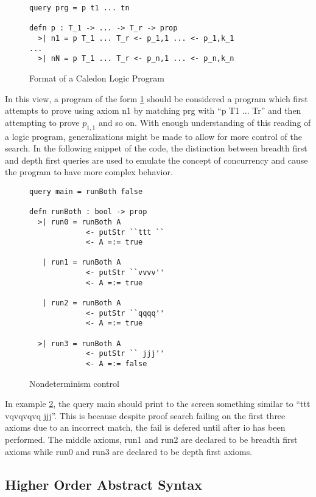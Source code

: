 \begin{figure}[H]
\begin{lstlisting}
query prg = p t1 ... tn

defn p : T_1 -> ... -> T_r -> prop
  >| n1 = p T_1 ... T_r <- p_1,1 ... <- p_1,k_1
...
  >| nN = p T_1 ... T_r <- p_n,1 ... <- p_n,k_n

\end{lstlisting}
\caption{Format of a Caledon Logic Program}
\label{code:format}
\end{figure}

In this view, a program of the form \ref{code:format}
should be considered a program which first attempts to prove using axiom n1 by matching prg with ``p T1 ... Tr'' and then
attempting to prove $p_{1,1}$ and so on.    With enough understanding of this reading of a logic program, generalizations might be made
to allow for more control of the search.  In the following snippet of the code, the distinction between breadth first and depth first
queries are used to emulate the concept of concurrency and cause the program to have more complex behavior.

\begin{figure}[H]
\begin{lstlisting}
query main = runBoth false

defn runBoth : bool -> prop
  >| run0 = runBoth A 
             <- putStr ``ttt ``
             <- A =:= true

   | run1 = runBoth A
             <- putStr ``vvvv''
             <- A =:= true

   | run2 = runBoth A
             <- putStr ``qqqq''
             <- A =:= true

  >| run3 = runBoth A
             <- putStr `` jjj''
             <- A =:= false
\end{lstlisting}
\caption{Nondeterminism control}
\label{code:nondet}
\end{figure}

In example \ref{code:nondet}, the query main should print to the screen something similar to ``ttt vqvqvqvq jjj''.  This is because
despite proof search failing on the first three axioms due to an incorrect match, 
the fail is defered until after io has been performed.  The middle axioms, run1 and run2 are declared to be
breadth first axioms while run0 and run3 are declared to be depth first axioms.  

\FloatBarrier
\subsection{Higher Order Abstract Syntax}

